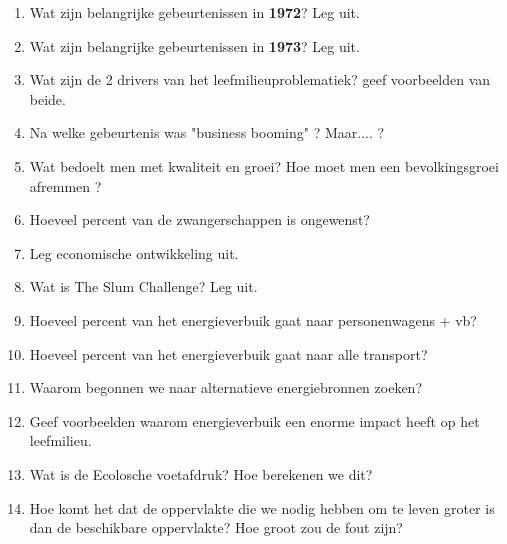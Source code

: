 \documentclass[12pt]{article}
\begin{document}
\begin{enumerate}
        \item Wat zijn belangrijke gebeurtenissen in \textbf{1972}? Leg uit.
        \item Wat zijn belangrijke gebeurtenissen in \textbf{1973}? Leg uit.
        \item Wat zijn de 2 drivers van het leefmilieuproblematiek? geef voorbeelden van beide.
        \item Na welke gebeurtenis was "business booming" ? Maar.... ?
        \item Wat bedoelt men met kwaliteit en groei? Hoe moet men een bevolkingsgroei afremmen ?
        \item Hoeveel percent van de zwangerschappen is ongewenst?
        \item Leg economische ontwikkeling uit. 
        \item Wat is The Slum Challenge? Leg uit.
        \item Hoeveel percent van het energieverbuik gaat naar personenwagens + vb?
        \item Hoeveel percent van het energieverbuik gaat naar alle transport?
        \item Waarom begonnen we naar alternatieve energiebronnen zoeken?
        \item Geef voorbeelden waarom energieverbuik een enorme impact heeft op het leefmilieu.
        \item Wat is de Ecolosche voetafdruk? Hoe berekenen we dit?
        \item Hoe komt het dat de oppervlakte die we nodig hebben om te leven groter is dan de beschikbare oppervlakte? Hoe groot zou de fout zijn?
    \end{enumerate}
    
\end{document}
